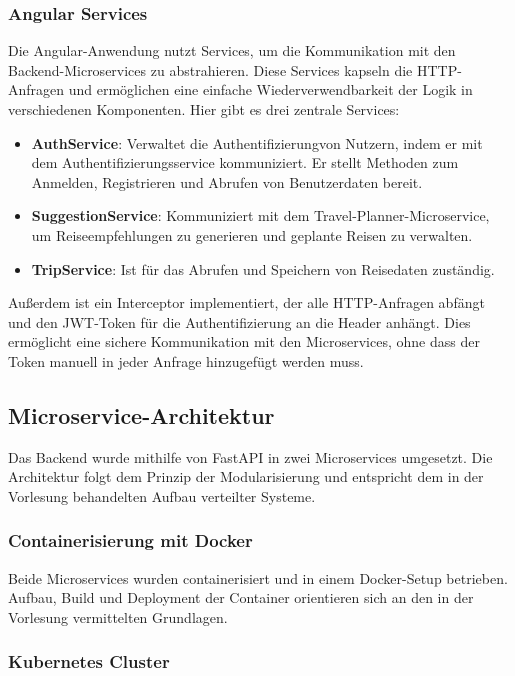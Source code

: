 \subsubsection{Angular Services}

Die Angular-Anwendung nutzt Services, um die Kommunikation mit den Backend-Microservices zu abstrahieren. Diese Services kapseln die HTTP-Anfragen und ermöglichen eine einfache Wiederverwendbarkeit der Logik in verschiedenen Komponenten.
Hier gibt es drei zentrale Services:

\begin{itemize}
  \item \textbf{AuthService}: Verwaltet die Authentifizierungvon Nutzern, indem er mit dem Authentifizierungsservice kommuniziert. Er stellt Methoden zum Anmelden, Registrieren und Abrufen von Benutzerdaten bereit.
  \item \textbf{SuggestionService}: Kommuniziert mit dem Travel-Planner-Microservice, um Reiseempfehlungen zu generieren und geplante Reisen zu verwalten.
  \item \textbf{TripService}: Ist für das Abrufen und Speichern von Reisedaten zuständig.
\end{itemize}

Außerdem ist ein Interceptor implementiert, der alle HTTP-Anfragen abfängt und den JWT-Token für die Authentifizierung an die Header anhängt. Dies ermöglicht eine sichere Kommunikation mit den Microservices, ohne dass der Token manuell in jeder Anfrage hinzugefügt werden muss.


\subsection{Microservice-Architektur}

Das Backend wurde mithilfe von FastAPI in zwei Microservices umgesetzt. Die Architektur folgt dem Prinzip der Modularisierung und entspricht dem in der Vorlesung behandelten Aufbau verteilter Systeme.

\subsubsection{Containerisierung mit Docker}

Beide Microservices wurden containerisiert und in einem Docker-Setup betrieben. Aufbau, Build und Deployment der Container orientieren sich an den in der Vorlesung vermittelten Grundlagen.

\subsubsection{Kubernetes Cluster}

